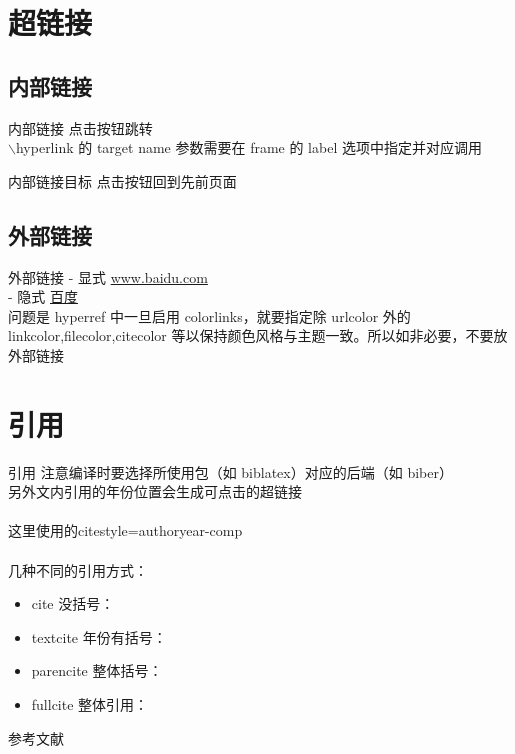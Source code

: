 \documentclass[UTF8,14pt,aspectratio=43,dvipsnames,svgnames,x11names,hyperref={urlcolor=blue}]{beamer}
\begin{document}
\section[超链接]{超链接}
\subsection[内部链接]{内部链接}
\begin{frame}[label=内部链接]{内部链接}
	点击按钮跳转 \hyperlink{内部链接目标}{}\\
	$\backslash$hyperlink 的 target name 参数需要在 frame 的 label 选项中指定并对应调用
\end{frame}

\begin{frame}[label=内部链接目标]{内部链接目标}
	点击按钮回到先前页面 \hyperlink{内部链接}{}
\end{frame}

\subsection[外部链接]{外部链接}
\begin{frame}{外部链接}
	- 显式 \url{www.baidu.com}\\
	- 隐式 \href{www.baidu.com}{百度}\\
	问题是 hyperref 中一旦启用 colorlinks，就要指定除 urlcolor 外的 linkcolor,filecolor,citecolor 等以保持颜色风格与主题一致。所以如非必要，不要放外部链接
\end{frame}

\section{引用}
\begin{frame}{引用}
	\footnotesize
	注意编译时要选择所使用包（如 biblatex）对应的后端（如 biber）\\
	另外文内引用的年份位置会生成可点击的超链接\\
	~\\
	这里使用的citestyle=authoryear-comp\\
	~\\
	几种不同的引用方式：
	\begin{itemize}
		\item cite 没括号：\cite{mincer1962job}
		\item textcite 年份有括号：\textcite{schultz1961investment}
		\item parencite 整体括号：\parencite{孟望生2018人力资本统计核算方法研究述评,李海峥2010中国人力资本测度与指数构建}
		\item fullcite 整体引用：
	\end{itemize}
\end{frame}

\begin{frame}{参考文献}
	\AtNextBibliography{\scriptsize} %
	\nocite{*} %
	\printbibliography %
\end{frame}
\end{document}
